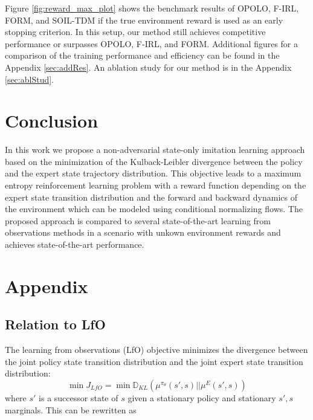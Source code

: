 \documentclass{article}
\begin{document}
Figure \ref{fig:reward_max_plot} shows the benchmark results of OPOLO, F-IRL, FORM, and SOIL-TDM if the true environment reward is used as an early stopping criterion. In this setup, our method still achieves competitive performance or surpasses OPOLO, F-IRL, and FORM. 
Additional figures for a comparison of the training performance and efficiency can be found in the Appendix \ref{sec:addRes}. An ablation study for our method is in the Appendix \ref{sec:ablStud}. 

\section{Conclusion}
In this work we propose a non-adversarial state-only imitation learning approach based on the minimization of the Kulback-Leibler divergence between the policy and the expert state trajectory distribution. This objective leads to a maximum entropy reinforcement learning problem with a reward function depending on the expert state transition distribution and the forward and backward dynamics of the environment which can be modeled using conditional normalizing flows. The proposed approach is compared to several state-of-the-art learning from observations methods in a scenario with unkown environment rewards and achieves state-of-the-art performance.




\begin{small}


\end{small}

\clearpage


\appendix
\section{Appendix}

\subsection{Relation to LfO}\label{appendix:lfo}
The learning from observations (LfO) objective minimizes the divergence between the joint policy state transition distribution and the joint expert state transition distribution:
\begin{equation}
    \min J_{LfO} = \min \mathbb{D}_{KL}(\mu^{\pi_{\theta}}(s',s)||\mu^E(s',s))
\end{equation}
where $s'$ is a successor state of $s$ given a stationary policy and stationary $s',s$ marginals. This can be rewritten as
\end{document}
